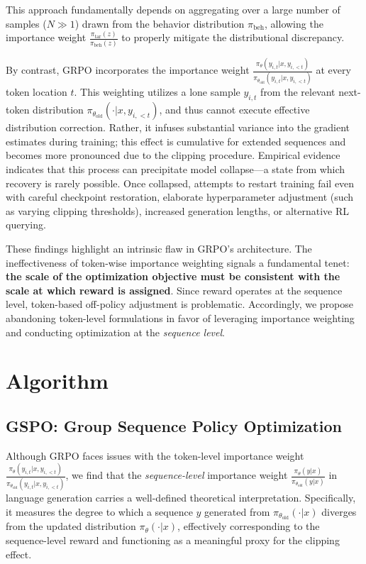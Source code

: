 This approach fundamentally depends on aggregating over a large number of samples ($N \gg 1$) drawn from the behavior distribution $\pi_\text{beh}$, allowing the importance weight $\frac{ \pi_\text{tar} (z) }{ \pi_\text{beh} (z)}$ to properly mitigate the distributional discrepancy.

By contrast, GRPO incorporates the importance weight $\frac{ \pi_{\theta} (y_{i,t} | x, y_{i,<t}) }{ \pi_{\theta_\text{old}} (y_{i,t} | x,y_{i,<t})}$ at every token location $t$. This weighting utilizes a lone sample $y_{i,t}$ from the relevant next-token distribution $\pi_{\theta_\text{old}}( \cdot | x, y_{i, <t})$, and thus cannot execute effective distribution correction. Rather, it infuses substantial variance into the gradient estimates during training; this effect is cumulative for extended sequences and becomes more pronounced due to the clipping procedure. Empirical evidence indicates that this process can precipitate model collapse—a state from which recovery is rarely possible. Once collapsed, attempts to restart training fail even with careful checkpoint restoration, elaborate hyperparameter adjustment (such as varying clipping thresholds), increased generation lengths, or alternative RL querying.

These findings highlight an intrinsic flaw in GRPO’s architecture. The ineffectiveness of token-wise importance weighting signals a fundamental tenet: \textbf{the scale of the optimization objective must be consistent with the scale at which reward is assigned}. Since reward operates at the sequence level, token-based off-policy adjustment is problematic. Accordingly, we propose abandoning token-level formulations in favor of leveraging importance weighting and conducting optimization at the \textit{sequence level}.

\section{Algorithm}

\subsection{GSPO: Group Sequence Policy Optimization}

Although GRPO faces issues with the token-level importance weight $\frac{ \pi_{\theta} (y_{i,t} | x, y_{i,<t}) }{ \pi_{\theta_\text{old}} (y_{i,t} | x,y_{i,<t})}$, we find that the \textit{sequence-level} importance weight $\frac{ \pi_{\theta} (y | x) }{ \pi_{\theta_\text{old}} (y | x)}$ in language generation carries a well-defined theoretical interpretation. Specifically, it measures the degree to which a sequence $y$ generated from $\pi_{\theta_\text{old}} (\cdot | x)$ diverges from the updated distribution $\pi_{\theta} (\cdot | x)$, effectively corresponding to the sequence-level reward and functioning as a meaningful proxy for the clipping effect.


